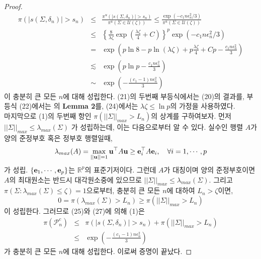 \begin{proof}
\begin{eqnarray}
      \pi(|s(\Sigma, \delta_n)| > s_n) &\leq& \frac{\pi^u(|s(\Sigma, \delta_n)| > s_n)}{\pi^u(\Sigma \in \mathcal{U}(\zeta))} \leq \frac{\exp \left( -c_1 n \epsilon_n^2 /3 \right)}{\pi^u(\Sigma \in \mathcal{U}(\zeta))}  \\
      &\leq& \left\{ \frac{8}{\lambda \zeta} \exp( \frac{\lambda \zeta}{4} + C) \right\}^p \exp(-c_1 n \epsilon_n^2 /3) \\
      &=& \exp \left( p \ln{8} - p \ln{(\lambda \zeta)} + p \frac{\lambda \zeta}{4} + Cp - \frac{c_1 n \epsilon_n^2}{3} \right) \\
      &\lesssim& \exp \left( p \ln{p} - \frac{c_1 n \epsilon_n^2}{3} \right)  \\
      &\sim& \exp \left( - \frac{(c_1 - 1) n \epsilon_n^2}{3} \right)
    \end{eqnarray}
    이 충분히 큰 모든 $n$에 대해 성립한다. (21)의 두번째 부등식에서는 (20)의 결과를, 부등식 (22)에서는 \cite{lee2022beta}의 \textbf{Lemma 2}를, (24)에서는 $\lambda \zeta \leq \ln{p}$의 가정을 사용하였다. \\
    마지막으로 (1)의 두번째 항인 $\pi ( ||\Sigma||_{max} > L_n)$의 상계를 구하여보자. 먼저 $||\Sigma||_{max} \leq \lambda_{max}(\Sigma)$ 가 성립하는데, 이는 다음으로부터 알 수 있다. 실수인 행렬 $A$가 양의 준정부호 혹은 정부호 행렬일때,
    \begin{eqnarray}
      \lambda_{max}(A) = \max_{||\vectorbold{u}||=1} \vectorbold{u}^\top A \vectorbold{u} \geq \vectorbold{e}_i^\top A \vectorbold{e}_i, \quad \forall i=1,\cdots,p
    \end{eqnarray}
    가 성립. $\{ \vectorbold{e}_1, \cdots, \vectorbold{e}_p \}$는 $\mathbb{R}^p$의 표준기저이다. 그런데 $A$가 대칭이며 양의 준정부호이면 $A$의 최대원소는 반드시 대각원소중에 있으므로 $||\Sigma||_{max} \leq \lambda_{max}(\Sigma).$ 그리고 $\pi(\Sigma : \lambda_{max}(\Sigma) \leq \zeta) = 1$으로부터, 충분히 큰 모든 $n$에 대하여 $L_n > \zeta$이면,
    \begin{equation}
      0 = \pi(\lambda_{max}(\Sigma) > L_n) \geq \pi(||\Sigma||_{max} > L_n)
    \end{equation}
    이 성립한다. 그러므로 (25)와 (27)에 의해 (1)은
    \begin{eqnarray}
    \pi(\mathcal{P}_n^c) &\leq& \pi(|s(\Sigma,\delta_n)| > s_n) + \pi(||\Sigma||_{max} > L_n) \\
    &\leq& \exp \left( - \frac{(c_1 - 1) n \epsilon_n^2}{3} \right)
  \end{eqnarray}
  가 충분히 큰 모든 $n$에 대해 성립한다. 이로써 증명이 끝났다.
  \end{proof}



